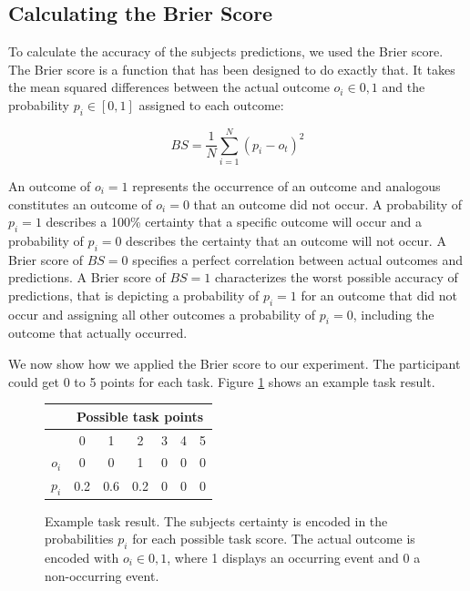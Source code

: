 \documentclass[../main/main.tex]{subfiles}
\begin{document}
	\subsection{Calculating the Brier Score}
	
	To calculate the accuracy of the subjects predictions, we used the Brier score. The Brier score is a function that has been designed to do exactly that. It takes the mean squared differences between the actual outcome $o_i \in {0, 1}$ and the probability $p_i \in [0, 1]$ assigned to each outcome:
	
	\begin{equation}
		BS = \frac{1}{N}\sum_{i=1}^{N} (p_i - o_t)^2
	\end{equation}
	
	\noindent An outcome of $o_i = 1$ represents the occurrence of an outcome and analogous constitutes an outcome of $o_i = 0$ that an outcome did not occur. A probability of $p_i = 1$ describes a 100\% certainty that a specific outcome will occur and a probability of $p_i = 0$ describes the certainty that an outcome will not occur. A Brier score of $BS = 0$ specifies a perfect correlation between actual outcomes and predictions. A Brier score of $BS = 1$ characterizes the worst possible accuracy of predictions, that is depicting a probability of $p_i = 1$ for an outcome that did not occur and assigning all other outcomes a probability of $p_i = 0$, including the outcome that actually occurred.
	
	We now show how we applied the Brier score to our experiment. The participant could get 0 to 5 points for each task. Figure \ref{fig:example} shows an example task result.
	
	\begin{figure}[h]
		\centering
		\begin{tabular}{c|c|c|c|c|c|c|}
			& \multicolumn{6}{c|}{Possible task points} \\
			\hline
			& 0 & 1 & 2 & 3 & 4 & 5 \\
			\hline
			$o_i$ & 0 & 0 & 1 & 0 & 0 & 0 \\
			$p_i$ & 0.2 & 0.6 & 0.2 & 0 & 0 & 0\\
		\end{tabular}
		\caption{Example task result. The subjects certainty is encoded in the probabilities $p_i$ for each possible task score. The actual outcome is encoded with $o_i \in {0, 1}$, where 1 displays an occurring event and 0 a non-occurring event.}
		\label{fig:example}
	\end{figure}
\end{document}
